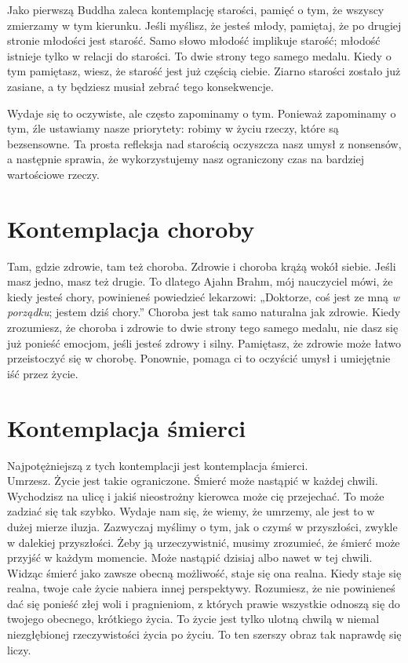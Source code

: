 \documentclass[12pt,openany]{book}
\begin{document}
Jako pierwszą Buddha zaleca kontemplację starości, pamięć o tym, że wszyscy zmierzamy w tym kierunku. Jeśli myślisz, że jesteś młody, pamiętaj, że po drugiej stronie młodości jest starość. Samo słowo młodość implikuje starość; młodość istnieje tylko w relacji do starości. To dwie strony tego samego medalu. Kiedy o tym pamiętasz, wiesz, że starość jest już częścią ciebie. Ziarno starości zostało już zasiane, a ty będziesz musiał zebrać tego konsekwencje.

Wydaje się to oczywiste, ale często zapominamy o tym. Ponieważ zapominamy o tym, źle ustawiamy nasze priorytety: robimy w życiu rzeczy, które są bezsensowne. Ta prosta refleksja nad starością oczyszcza nasz umysł z nonsensów, a następnie sprawia, że wykorzystujemy nasz ograniczony czas na bardziej wartościowe rzeczy.

\section*{Kontemplacja choroby}

Tam, gdzie zdrowie, tam też choroba. Zdrowie i choroba krążą wokół siebie. Jeśli masz jedno, masz też drugie. To dlatego Ajahn Brahm, mój nauczyciel mówi, że kiedy jesteś chory, powinieneś powiedzieć lekarzowi: „Doktorze, coś jest ze mną \textit{w porządku}; jestem dziś chory.” Choroba jest tak samo naturalna jak zdrowie. Kiedy zrozumiesz, że choroba i zdrowie to dwie strony tego samego medalu, nie dasz się już ponieść emocjom, jeśli jesteś zdrowy i silny. Pamiętasz, że zdrowie może łatwo przeistoczyć się w chorobę. Ponownie, pomaga ci to oczyścić umysł i umiejętnie iść przez życie.

\section*{Kontemplacja śmierci}

Najpotężniejszą z tych kontemplacji jest kontemplacja śmierci. \\ Umrzesz. Życie jest takie ograniczone. Śmierć może nastąpić w każdej chwili. Wychodzisz na ulicę i jakiś nieostrożny kierowca może cię przejechać. To może zadziać się tak szybko.
Wydaje nam się, że wiemy, że umrzemy, ale jest to w dużej mierze iluzja. Zazwyczaj myślimy o tym, jak o czymś w przyszłości, zwykle w dalekiej przyszłości. Żeby ją urzeczywistnić, musimy zrozumieć, że śmierć może przyjść w każdym momencie. Może nastąpić dzisiaj albo nawet w tej chwili. Widząc śmierć jako zawsze obecną możliwość, staje się ona realna. Kiedy staje się realna, twoje całe życie nabiera innej perspektywy. Rozumiesz, że nie powinieneś dać się ponieść złej woli i pragnieniom, z których prawie wszystkie odnoszą się do twojego obecnego, krótkiego życia. To życie jest tylko ulotną chwilą w niemal niezgłębionej rzeczywistości życia po życiu. To ten szerszy obraz tak naprawdę się liczy.
\end{document}
